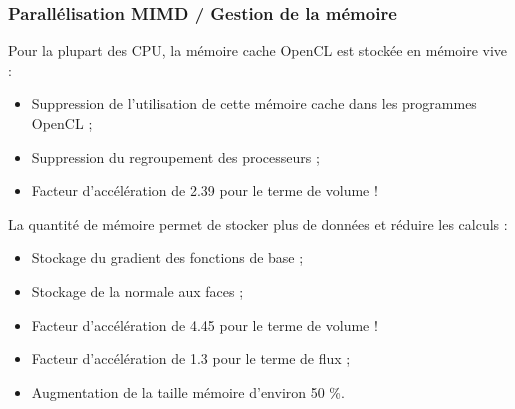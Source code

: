 \begin{frame}
\frametitle{Parallélisation MIMD / Gestion de la mémoire}
\vfill
Pour la plupart des CPU, la mémoire cache OpenCL est stockée en mémoire vive :
\begin{itemize}
\item Suppression de l'utilisation de cette mémoire cache dans les programmes OpenCL ;
\item Suppression du regroupement des processeurs ;
\item Facteur d'accélération de 2.39 pour le terme de volume !
\end{itemize}
\vfill
La quantité de mémoire permet de stocker plus de données et réduire les calculs :
\begin{itemize}
\item Stockage du gradient des fonctions de base ;
\item Stockage de la normale aux faces ;
\item Facteur d'accélération de 4.45 pour le terme de volume !
\item Facteur d'accélération de 1.3 pour le terme de flux ;
\item Augmentation de la taille mémoire d'environ 50 \%.
\end{itemize}
\vfill
\end{frame}

